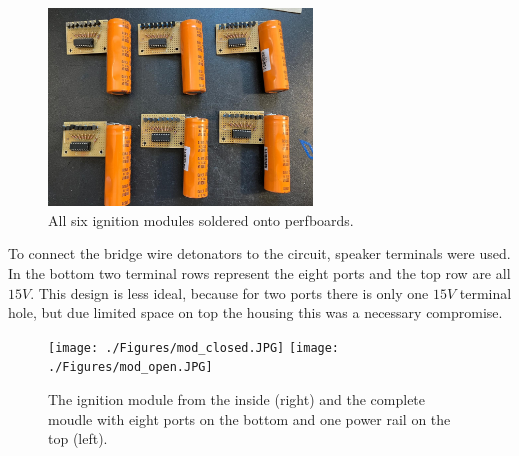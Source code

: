 \begin{figure}[!ht]
    \centering
    \includegraphics[width=7cm]{./Figures/raw_modules.jpeg}
    \caption{All six ignition modules soldered onto perfboards.}
    \label{fig:raw_modules}     
\end{figure}

\noindent To connect the bridge wire detonators to the circuit, speaker terminals were used.  In  the bottom two terminal rows represent the eight ports and the top row are all $15V$. This design is less ideal, because for two ports there is only one $15V$ terminal hole, but due limited space on top the housing this was a necessary compromise.  \\

\begin{figure}[!ht]
    \centering
    \texttt{[image: ./Figures/mod\_closed.JPG]}
    \texttt{[image: ./Figures/mod\_open.JPG]}
    \caption{The ignition module from the inside (right) and the complete moudle with eight ports on the bottom and one power rail on the top (left).}
    \label{fig:mod_open}     
\end{figure}

\pagebreak
